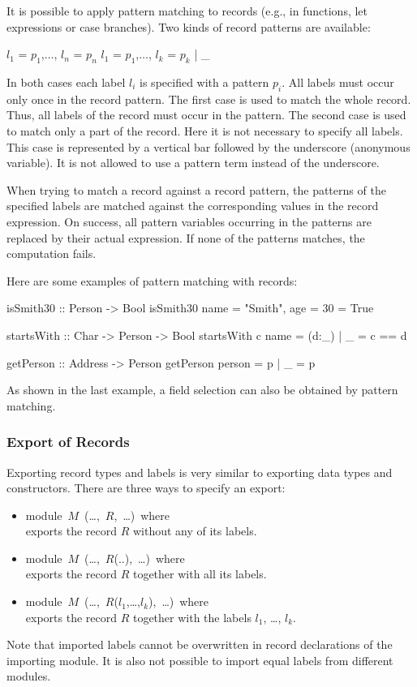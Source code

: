 \documentclass[11pt,fleqn]{article}
\renewcommand{\tt}{\usefont{OT1}{cmtt}{m}{n}\selectfont}
\newcommand{\codefont}{\small\tt}
\newcommand{\code}[1]{\mbox{\codefont #1}}
\begin{document}
It is possible to apply pattern matching to records (e.g., in functions,
let expressions or case branches). Two kinds of record patterns
are available:
\begin{curry}
{$l_1$ = $p_1$,$\ldots$, $l_n$ = $p_n$}
{$l_1$ = $p_1$,$\ldots$, $l_k$ = $p_k$ | _}
\end{curry}
In both cases each label $l_i$ is specified with a pattern $p_i$. 
All labels must occur only once in the record pattern.
The first case is used to match the whole record. Thus, all labels
of the record must occur in the pattern. 
The second case is used to match only a part of
the record. Here it is not necessary to specify all labels.
This case is represented by a vertical bar followed by the underscore
(anonymous variable). It is
not allowed to use a pattern term instead of the underscore.


When trying to match a record against a record pattern, the 
patterns of the specified labels are matched against 
the corresponding values in the record expression. On success, all pattern
variables occurring in the patterns are replaced by their actual expression.
If none of the patterns matches, the computation fails.


Here are some examples of pattern matching with records:
\begin{curry}
isSmith30 :: Person -> Bool
isSmith30 {name = "Smith", age = 30} = True
\end{curry}
\begin{curry}
startsWith :: Char -> Person -> Bool
startsWith c {name = (d:_) | _} = c == d
\end{curry}
\begin{curry}
getPerson :: Address -> Person
getPerson {person = p | _} = p
\end{curry}
As shown in the last example, a field selection can also be obtained
by pattern matching.


\subsubsection{Export of Records}
\label{sec-exprecs}

Exporting record types and labels is very similar to exporting
data types and constructors. There are three ways 
to specify an export:
\begin{itemize}
\item \code{module $M$ (\ldots, $R$, \ldots) where} \\
  exports the record $R$ without any of its labels.
\item \code{module $M$ (\ldots, $R$(..), \ldots) where} \\
  exports the record $R$ together with all its labels.
\item \code{module $M$ (\ldots, $R$($l_1$,\ldots,$l_k$), \ldots) where} \\
  exports the record $R$ together with the labels $l_1$, \ldots, $l_k$.
\end{itemize}
%
Note that imported labels cannot be overwritten in record declarations
of the importing module. It is also not possible to import equal labels
from different modules.
\end{document}
